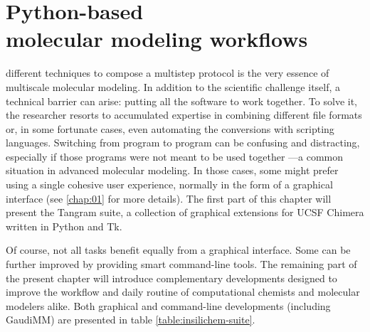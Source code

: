 
\chapter[Python-based molecular modeling workflows]{Python-based \\
molecular modeling workflows}
\label{chap:05}

 different techniques to compose a multistep protocol is the very essence of multiscale molecular modeling. In addition to the scientific challenge itself, a technical barrier can arise: putting all the software to work together. To solve it, the researcher resorts to accumulated expertise in combining different file formats or, in some fortunate cases, even automating the conversions with scripting languages. Switching from program to program can be confusing and distracting, especially if those programs were not meant to be used together ---a common situation in advanced molecular modeling. In those cases, some might prefer using a single cohesive user experience, normally in the form of a graphical interface (see \autoref{chap:01} for more details). The first part of this chapter will present the Tangram suite, a collection of graphical extensions for UCSF Chimera written in Python and Tk.

Of course, not all tasks benefit equally from a graphical interface. Some can be further improved by providing smart command-line tools. The remaining part of the present chapter will introduce complementary developments designed to improve the workflow and daily routine of computational chemists and molecular modelers alike. Both graphical and command-line developments (including GaudiMM) are presented in table \ref{table:insilichem-suite}.


